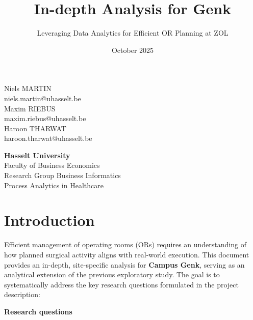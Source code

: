 \documentclass[
]{article}
\title{In-depth Analysis for Genk}
\subtitle{Leveraging Data Analytics for Efficient OR Planning at ZOL}
\author{}
\date{\vspace{-2.5em}October 2025}
\begin{document}
\maketitle

\begin{center}
\vspace{2cm}

Niels MARTIN\\
niels.martin@uhasselt.be\\[0.5em]
Maxim RIEBUS\\
maxim.riebus@uhasselt.be\\[0.5em]
Haroon THARWAT\\
haroon.tharwat@uhasselt.be\\

\vspace{6cm}

\textbf{Hasselt University} \\
Faculty of Business Economics \\
Research Group Business Informatics \\
Process Analytics in Healthcare
\end{center}

\newpage
\tableofcontents
\newpage

\section{Introduction}\label{introduction}

Efficient management of operating rooms (ORs) requires an understanding
of how planned surgical activity aligns with real-world execution. This
document provides an in-depth, site-specific analysis for \textbf{Campus
Genk}, serving as an analytical extension of the previous exploratory
study. The goal is to systematically address the key research questions
formulated in the project description:

\textbf{Research questions}
\end{document}
